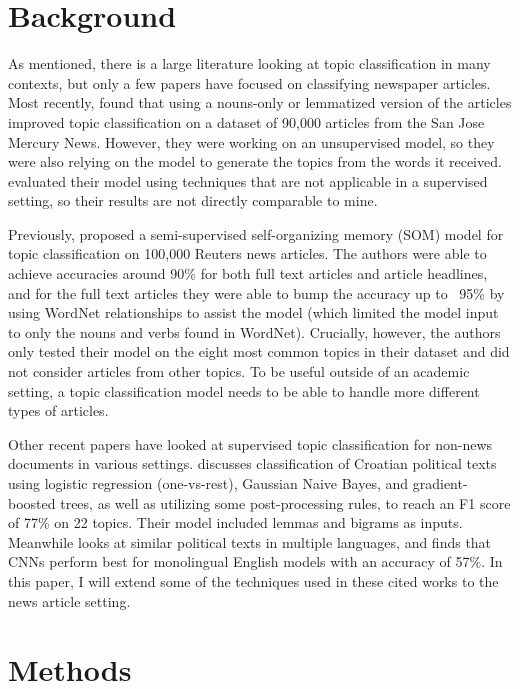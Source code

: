 \documentclass[11pt,a4paper,table]{article}
\begin{document}
\section{Background}
\label{sec:back}

As mentioned, there is a large literature looking at topic classification in many contexts, but only a few papers have focused on classifying newspaper articles. Most recently, \citet{Martin:15} found that using a nouns-only or lemmatized version of the articles improved topic classification on a dataset of 90,000 articles from the San Jose Mercury News. However, they were working on an unsupervised model, so they were also relying on the model to generate the topics from the words it received. \citeauthor{Martin:15} evaluated their model using techniques that are not applicable in a supervised setting, so their results are not directly comparable to mine.

Previously, \citet{Wermter:02} proposed a semi-supervised self-organizing memory (SOM) model for topic classification on 100,000 Reuters news articles. The authors were able to achieve accuracies around 90\% for both full text articles and article headlines, and for the full text articles they were able to bump the accuracy up to ~95\% by using WordNet relationships to assist the model (which limited the model input to only the nouns and verbs found in WordNet). Crucially, however, the authors only tested their model on the eight most common topics in their dataset and did not consider articles from other topics. To be useful outside of an academic setting, a topic classification model needs to be able to handle more different types of articles.

Other recent papers have looked at supervised topic classification for non-news documents in various settings. \citet{Karan:16} discusses classification of Croatian political texts using logistic regression (one-vs-rest), Gaussian Naive Bayes, and gradient-boosted trees, as well as utilizing some post-processing rules, to reach an F1 score of 77\% on 22 topics. Their model included lemmas and bigrams as inputs. Meanwhile \citet{Glavas:17} looks at similar political texts in multiple languages, and finds that CNNs perform best for monolingual English models with an accuracy of 57\%. In this paper, I will extend some of the techniques used in these cited works to the news article setting.

\section{Methods}
\label{sec:methods}
\end{document}
